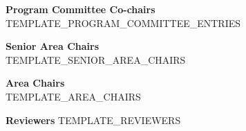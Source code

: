 \textbf{Program Committee Co-chairs}\\
TEMPLATE_PROGRAM_COMMITTEE_ENTRIES

\textbf{Senior Area Chairs}\\
TEMPLATE_SENIOR_AREA_CHAIRS

\textbf{Area Chairs}\\
TEMPLATE_AREA_CHAIRS

\textbf{Reviewers}
TEMPLATE_REVIEWERS